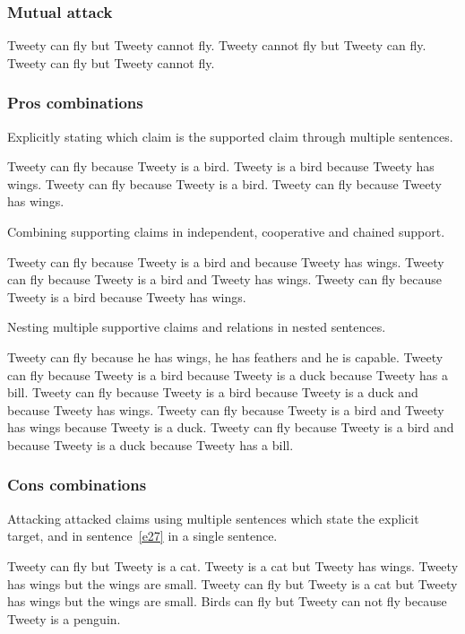 \subsubsection{Mutual attack}
\begin{exe}
\ex\label{e14} Tweety can fly but Tweety cannot fly. Tweety cannot fly but Tweety can fly.
\ex\label{e15} Tweety can fly but Tweety cannot fly.
\end{exe}

\subsubsection{Pros combinations}
Explicitly stating which claim is the supported claim through multiple sentences.
\begin{exe}
\ex\label{e16} Tweety can fly because Tweety is a bird. Tweety is a bird because Tweety has wings.
\ex\label{e17} Tweety can fly because Tweety is a bird. Tweety can fly because Tweety has wings.
\end{exe}

\noindent Combining supporting claims in independent, cooperative and chained support.
\begin{exe}
\ex\label{e18} Tweety can fly because Tweety is a bird and because Tweety has wings.
\ex\label{e19} Tweety can fly because Tweety is a bird and Tweety has wings.
\ex\label{e20} Tweety can fly because Tweety is a bird because Tweety has wings.
\end{exe}

\noindent Nesting multiple supportive claims and relations in nested sentences.
\begin{exe}
\ex\label{e21} Tweety can fly because he has wings, he has feathers and he is capable.
\ex\label{e22} Tweety can fly because Tweety is a bird because Tweety is a duck because Tweety has a bill.
\ex\label{e23} Tweety can fly because Tweety is a bird because Tweety is a duck and because Tweety has wings.
\ex\label{e24} Tweety can fly because Tweety is a bird and Tweety has wings because Tweety is a duck.
\ex\label{e25} Tweety can fly because Tweety is a bird and because Tweety is a duck because Tweety has a bill.
\end{exe}

\subsubsection{Cons combinations}
Attacking attacked claims using multiple sentences which state the explicit target, and in sentence~\ref{e27} in a single sentence. 
\begin{exe}
\ex\label{e26} Tweety can fly but Tweety is a cat. Tweety is a cat but Tweety has wings. Tweety has wings but the wings are small.
\ex\label{e27} Tweety can fly but Tweety is a cat but Tweety has wings but the wings are small.
\ex\label{e110} Birds can fly but Tweety can not fly because Tweety is a penguin.
\end{exe}

